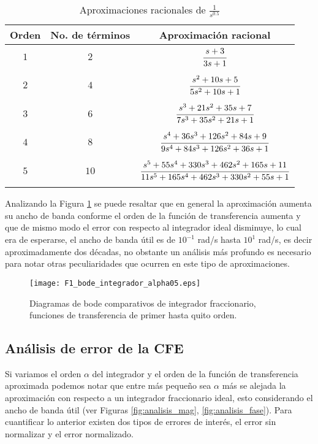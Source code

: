 	\begin{table}[!hbp]
		\caption{Aproximaciones racionales de $\frac{1}{s^{0.5}}$}
		\label{tab:aprox_cfe_alpha_0.5}
		\centering
		\begin{tabular}{c c c}
			\hline
			\textbf{Orden} &  \textbf{No. de términos} & \textbf{Aproximación racional}\\
			\hline
			$1$ 		& $2$ 		&  $\cfrac{s + 3}{3s + 1}$\\
					 		& 		 		& \\
			$2$			& $4$ 		&  $\cfrac{s^{2} + 10s + 5}{5 s^{2} + 10s + 1}$\\
							& 		 		& \\
			$3$ 		& $6$ 		&  $\cfrac{s^{3} + 21s^{2} + 35s + 7}{7 s^3 + 35 s^2 + 21 s + 1}$	\\
							& 		 		& \\
			$4$ 		& $8$ 		&  $\cfrac{s^4 + 36 s^3 + 126 s^2 + 84 s + 9}{9 s^4 + 84 s^3 + 126 s^2 + 36 s + 1}$\\
							& 		 		& \\
			$5$ 		& $10$ 		&  $\cfrac{s^5 + 55 s^4 + 330 s^3 + 462 s^2 + 165 s + 11}{11 s^5 + 165 s^4 + 462 s^3 + 330 s^2 + 55 s + 1}$\\
							& 		 		& \\
			\hline
		\end{tabular}
	\end{table}
	
	Analizando la Figura \ref{fig:F1_bode_integrador_alpha05} se puede resaltar que en general la aproximación aumenta su ancho de banda conforme el orden de la función de transferencia aumenta y que de mismo modo el error con respecto al integrador ideal disminuye, lo cual era de esperarse, el ancho de banda útil es de $10^{-1}$ rad/s hasta $10^{1}$ rad/s, es decir aproximadamente dos décadas, no obstante un análisis más profundo es necesario para notar otras peculiaridades que ocurren en este tipo de aproximaciones.
	
	\begin{figure}[hbtp]
	\caption{Diagramas de bode comparativos de integrador fraccionario, funciones de transferencia de primer hasta quito orden.} 
	\label{fig:F1_bode_integrador_alpha05}
	\centering
	\texttt{[image: F1\_bode\_integrador\_alpha05.eps]}
	\end{figure}
	
	\subsection{Análisis de error de la CFE}
	Si variamos el orden $\alpha$ del integrador y el orden de la función de transferencia aproximada podemos notar que entre más pequeño sea $\alpha$ más se alejada la aproximación con respecto a un integrador fraccionario ideal, esto considerando el ancho de banda útil (ver Figuras \ref{fig:analisis_mag}, \ref{fig:analisis_fase}). Para cuantificar lo anterior existen dos tipos de errores de interés, el error sin normalizar y el error normalizado.
	

